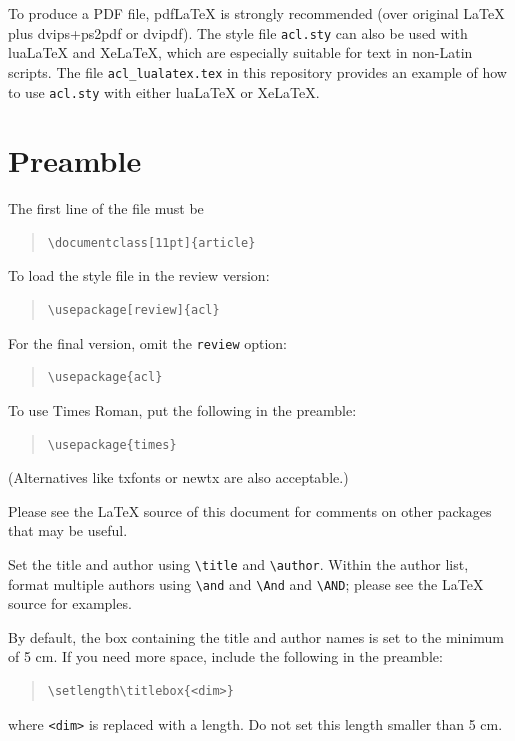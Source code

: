 \documentclass[11pt]{article}
\begin{document}
To produce a PDF file, pdf\LaTeX{} is strongly recommended (over original \LaTeX{} plus dvips+ps2pdf or dvipdf).
The style file \texttt{acl.sty} can also be used with
lua\LaTeX{} and
Xe\LaTeX{}, which are especially suitable for text in non-Latin scripts.
The file \texttt{acl\_lualatex.tex} in this repository provides
an example of how to use \texttt{acl.sty} with either
lua\LaTeX{} or
Xe\LaTeX{}.

\section{Preamble}

The first line of the file must be
\begin{quote}
\begin{verbatim}
\documentclass[11pt]{article}
\end{verbatim}
\end{quote}

To load the style file in the review version:
\begin{quote}
\begin{verbatim}
\usepackage[review]{acl}
\end{verbatim}
\end{quote}
For the final version, omit the \verb|review| option:
\begin{quote}
\begin{verbatim}
\usepackage{acl}
\end{verbatim}
\end{quote}

To use Times Roman, put the following in the preamble:
\begin{quote}
\begin{verbatim}
\usepackage{times}
\end{verbatim}
\end{quote}
(Alternatives like txfonts or newtx are also acceptable.)

Please see the \LaTeX{} source of this document for comments on other packages that may be useful.

Set the title and author using \verb|\title| and \verb|\author|. Within the author list, format multiple authors using \verb|\and| and \verb|\And| and \verb|\AND|; please see the \LaTeX{} source for examples.

By default, the box containing the title and author names is set to the minimum of 5 cm. If you need more space, include the following in the preamble:
\begin{quote}
\begin{verbatim}
\setlength\titlebox{<dim>}
\end{verbatim}
\end{quote}
where \verb|<dim>| is replaced with a length. Do not set this length smaller than 5 cm.
\end{document}
